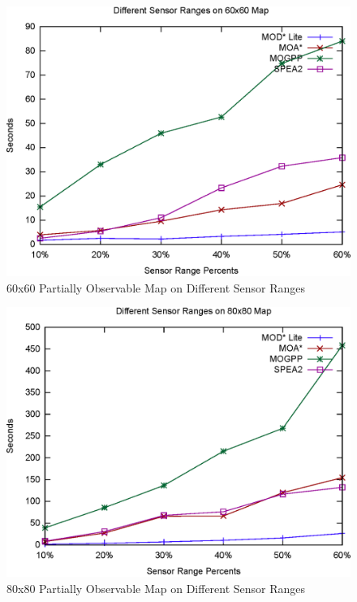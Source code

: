 \documentclass[10pt,journal]{IEEEtran}
\begin{document}
\begin{figure}
\centering
\includegraphics[scale=0.45]{experimental/60x60_partially}
\caption{60x60 Partially Observable Map on Different Sensor Ranges}
\label{fig:60x60sensor}
\end{figure}

\begin{figure}
\centering
\includegraphics[scale=0.45]{experimental/80x80_partially}
\caption{80x80 Partially Observable Map on Different Sensor Ranges}
\label{fig:80x80sensor}
\end{figure}
\end{document}

